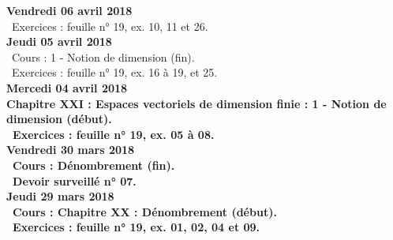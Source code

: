 \documentclass[12pt,a4paper]{article}
\begin{document}
% 
% 
% 

\noindent\textbf{Vendredi 06 avril 2018}\\
\bu\ Exercices : feuille n° 19, ex. 10, 11 et 26.\vspace{.4cm}\\

\noindent\textbf{Jeudi 05 avril 2018}\\
\bu\ Cours : 1 - Notion de dimension (fin).\\
\bu\ Exercices : feuille n° 19, ex. 16 à 19, et 25.\vspace{.4cm}\\

\noindent\textbf{Mercedi 04 avril 2018}\\
\bf Chapitre XXI \rm : Espaces vectoriels de dimension finie  : 1 - Notion de dimension (début).\\
\bu\ Exercices : feuille n° 19, ex. 05 à 08.\vspace{.4cm}\\

\noindent\textbf{Vendredi 30 mars 2018}\\
\bu\ Cours : Dénombrement (fin).\\
\bu\ Devoir surveillé n° 07.\vspace{.4cm}\\

\noindent\textbf{Jeudi 29 mars 2018}\\
\bu\ Cours : \bf Chapitre XX \rm : Dénombrement (début).\\
\bu\ Exercices : feuille n° 19, ex. 01, 02, 04 et 09.\vspace{.4cm}\\
\end{document}
